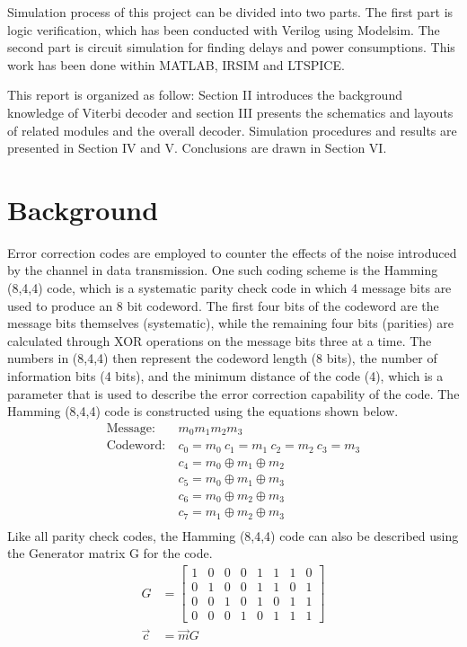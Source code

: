 \documentclass[conference]{IEEEtran}
\begin{document}
Simulation process of this project can be divided into two parts. The first part is logic verification, which has been conducted with Verilog using Modelsim. The second part is circuit simulation for finding delays and power consumptions. This work has been done within MATLAB, IRSIM and LTSPICE.

This report is organized as follow: Section II introduces the background knowledge of Viterbi decoder and section III presents the schematics and layouts of related modules and the overall decoder. Simulation procedures and results are presented in Section IV and V. Conclusions are drawn in Section VI.

\section {Background}
Error correction codes are employed to counter the effects of the noise introduced by the channel in data transmission. One such coding scheme is the Hamming (8,4,4) code, which is a systematic parity check code in which 4 message bits are used to produce an 8 bit codeword. The first four bits of the codeword are the message bits themselves (systematic), while the remaining four bits (parities) are calculated through XOR operations on the message bits three at a time. The numbers in (8,4,4) then represent the codeword length (8 bits), the number of information bits (4 bits), and the minimum distance of the code (4), which is a parameter that is used to describe the error correction capability of the code. The Hamming (8,4,4) code is constructed using the equations shown below.
\begin{equation}
\begin{align}
    \text{Message:}\ &m_{0}m_{1}m_{2}m_{3}\\
    \text{Codeword:}\ &c_{0} = m_{0}\ c_{1} = m_{1}\ c_{2} = m_{2}\ c_{3} = m_{3}\\
    &c_{4} = m_{0}\oplus m_{1}\oplus m_{2}\\
    &c_{5} = m_{0}\oplus m_{1}\oplus m_{3}\\
    &c_{6} = m_{0}\oplus m_{2}\oplus m_{3}\\
    &c_{7} = m_{1}\oplus m_{2}\oplus m_{3}\\
\end{align}
\end{equation}
Like all parity check codes, the Hamming (8,4,4) code can also be described using the Generator matrix G for the code.
\begin{equation}
\begin{align}
G&=
\begin{bmatrix}
1 & 0 & 0 & 0 & 1 & 1 & 1 & 0\\ 
0 & 1 & 0 & 0 & 1 & 1 & 0 & 1\\ 
0 & 0 & 1 & 0 & 1 & 0 & 1 & 1\\ 
0 & 0 & 0 & 1 & 0 & 1 & 1 & 1
\end{bmatrix}\\
\vec{c} &= \vec{m}G
\end{align}
\end{equation}
\end{document}
